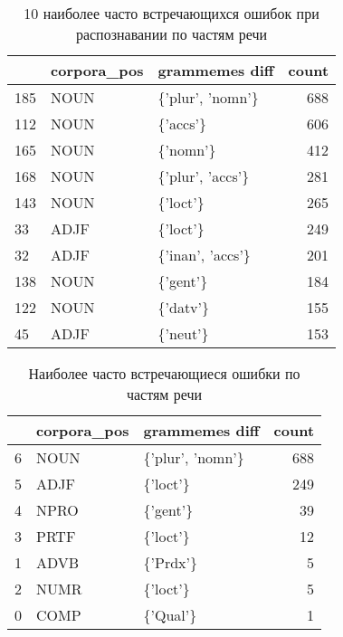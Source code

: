 \documentclass[a4paper,14pt]{article}
\begin{document}
	\begin{table}[h!]
		\begin{center}
			\begin{tabular}{lllr}
			\toprule
			{} & corpora\_pos &            grammemes diff &  count \\
			\midrule
			185 &        NOUN &  \{'plur', 'nomn'\} &    688 \\
			112 &        NOUN &          \{'accs'\} &    606 \\
			165 &        NOUN &          \{'nomn'\} &    412 \\
			168 &        NOUN &  \{'plur', 'accs'\} &    281 \\
			143 &        NOUN &          \{'loct'\} &    265 \\
			33  &        ADJF &          \{'loct'\} &    249 \\
			32  &        ADJF &  \{'inan', 'accs'\} &    201 \\
			138 &        NOUN &          \{'gent'\} &    184 \\
			122 &        NOUN &          \{'datv'\} &    155 \\
			45  &        ADJF &          \{'neut'\} &    153 \\
			\bottomrule
			\end{tabular}
			\caption{10 наиболее часто встречающихся ошибок при распознавании по частям речи}
		\end{center}
	\end{table}

	\begin{table}[h!]
		\begin{center}
		\begin{tabular}{lllr}
			\toprule
			{} & corpora\_pos &            grammemes diff &  count \\
			\midrule
			6 &        NOUN &  \{'plur', 'nomn'\} &    688 \\
			5 &        ADJF &          \{'loct'\} &    249 \\
			4 &        NPRO &          \{'gent'\} &     39 \\
			3 &        PRTF &          \{'loct'\} &     12 \\
			1 &        ADVB &          \{'Prdx'\} &      5 \\
			2 &        NUMR &          \{'loct'\} &      5 \\
			0 &        COMP &          \{'Qual'\} &      1 \\
			\bottomrule
			\end{tabular}
			\caption{Наиболее часто встречающиеся ошибки по частям речи}
		\end{center}
	\end{table}
\end{document}
